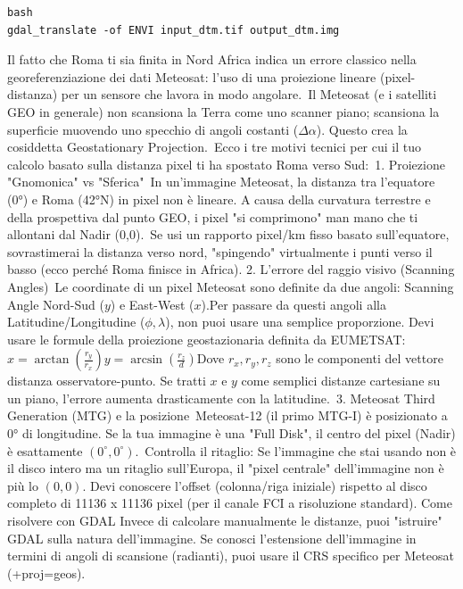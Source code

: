 \documentclass[a4paper,14pt]{article}
\begin{document}
\begin{verbatim}
bash
gdal_translate -of ENVI input_dtm.tif output_dtm.img
\end{verbatim}
Il fatto che Roma ti sia finita in Nord Africa indica un errore classico nella georeferenziazione dei dati Meteosat: l'uso di una proiezione lineare (pixel-distanza) per un sensore che lavora in modo angolare. Il Meteosat (e i satelliti GEO in generale) non scansiona la Terra come uno scanner piano; scansiona la superficie muovendo uno specchio di angoli costanti (\(\Delta \alpha \)). Questo crea la cosiddetta Geostationary Projection. Ecco i tre motivi tecnici per cui il tuo calcolo basato sulla distanza pixel ti ha spostato Roma verso Sud: 1. Proiezione "Gnomonica" vs "Sferica" In un'immagine Meteosat, la distanza tra l'equatore (0°) e Roma (42°N) in pixel non è lineare. A causa della curvatura terrestre e della prospettiva dal punto GEO, i pixel "si comprimono" man mano che ti allontani dal Nadir (0,0). Se usi un rapporto pixel/km fisso basato sull'equatore, sovrastimerai la distanza verso nord, "spingendo" virtualmente i punti verso il basso (ecco perché Roma finisce in Africa).
2. L'errore del raggio visivo (Scanning Angles) Le coordinate di un pixel Meteosat sono definite da due angoli: Scanning Angle Nord-Sud (\(y\)) e East-West (\(x\)).Per passare da questi angoli alla Latitudine/Longitudine (\(\phi ,\lambda \)), non puoi usare una semplice proporzione. Devi usare le formule della proiezione geostazionaria definita da EUMETSAT: \(x=\arctan \left(\frac{r_{y}}{r_{x}}\right)\)\(y=\arcsin \left(\frac{r_{z}}{d}\right)\)Dove \(r_{x},r_{y},r_{z}\) sono le componenti del vettore distanza osservatore-punto. Se tratti \(x\) e \(y\) come semplici distanze cartesiane su un piano, l'errore aumenta drasticamente con la latitudine. 3. Meteosat Third Generation (MTG) e la posizione Meteosat-12 (il primo MTG-I) è posizionato a 0° di longitudine. Se la tua immagine è una "Full Disk", il centro del pixel (Nadir) è esattamente \((0^{\circ },0^{\circ })\). Controlla il ritaglio: Se l'immagine che stai usando non è il disco intero ma un ritaglio sull'Europa, il "pixel centrale" dell'immagine non è più lo \((0,0)\). Devi conoscere l'offset (colonna/riga iniziale) rispetto al disco completo di 11136 x 11136 pixel (per il canale FCI a risoluzione standard).
Come risolvere con GDAL
Invece di calcolare manualmente le distanze, puoi "istruire" GDAL sulla natura dell'immagine. Se conosci l'estensione dell'immagine in termini di angoli di scansione (radianti), puoi usare il CRS specifico per Meteosat (+proj=geos).
\end{document}
